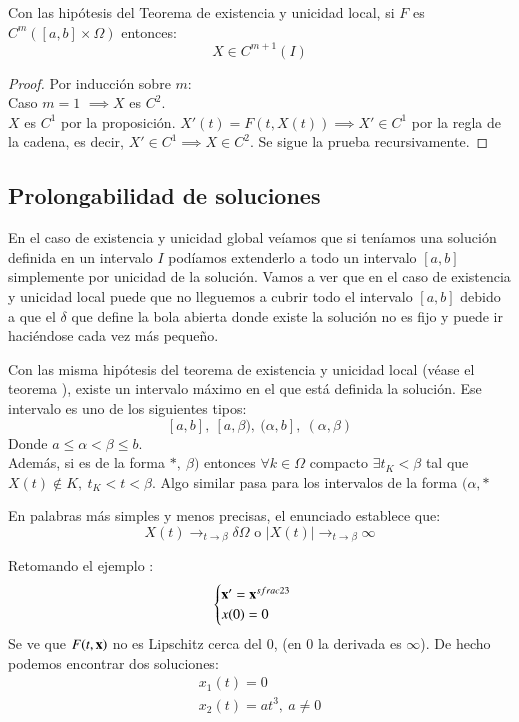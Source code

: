 \begin{pro}
    Con las hipótesis del Teorema de existencia y unicidad local, si $F$ es $C^m ([a,b]\times\Omega)$ entonces:
    $$
        X \in C^{m+1}(I)
    $$
\end{pro}
\begin{proof}
    Por inducción sobre $m$:\\
    Caso $m=1$ $\implies X$ es $C^2$.\\
    $X$ es $C^1$ por la proposición. $X'(t) = F(t, X(t)) \implies X' \in C^1$ por la regla de la cadena, es decir, $X' \in C^1 \implies X \in C^2$. Se sigue la prueba recursivamente.
\end{proof}

\subsection{Prolongabilidad de soluciones}
En el caso de existencia y unicidad global veíamos que si teníamos una solución definida en un intervalo $I$ podíamos extenderlo a todo un intervalo $[a, b]$ simplemente por unicidad de la solución. Vamos a ver que en el caso de existencia y unicidad local puede que no lleguemos a cubrir todo el intervalo $[a, b]$ debido a que el $\delta$ que define la bola abierta donde existe la solución no es fijo y puede ir haciéndose cada vez más pequeño.

\begin{pro}
    Con las misma hipótesis del teorema de existencia y unicidad local (véase el teorema \label{thm:exist-unic-local}), existe un intervalo máximo en el que está definida la solución. Ese intervalo es uno de los siguientes tipos:
    $$[a, b],\ [a,\beta),\ (\alpha, b],\ (\alpha, \beta)
    $$
    Donde $a \leq \alpha < \beta \leq b$.\\
    Además, si es de la forma $*,\ \beta)$ entonces $\forall k \in \Omega$ compacto $\exists t_K < \beta$ tal que $X(t)\not \in K,\ t_K < t < \beta$. Algo similar pasa para los intervalos de la forma $(\alpha, *$
\end{pro}
\begin{obs}
    En palabras más simples y menos precisas, el enunciado establece que:
    $$
        X(t) \to_{t\to\beta} \delta \Omega \text{ o } |X(t)| \to_{t\to\beta} \infty
    $$
\end{obs}
\begin{eg}
    Retomando el ejemplo \label{eg:no-unic}:
    $$
        \begin{cases}
            \mathbf{x}' = \mathbf{x}^{sfrac{2}{3}}\\
            x(0) = 0
        \end{cases}
    $$
    Se ve que $F(t, \mathbf{x})$ no es Lipschitz cerca del $0$, (en $0$ la derivada es $\infty$). De hecho podemos encontrar dos soluciones:
    \begin{gather*}
        x_1(t) = 0\\
        x_2(t) = at^3,\ a \neq 0
    \end{gather*}
\end{eg}

